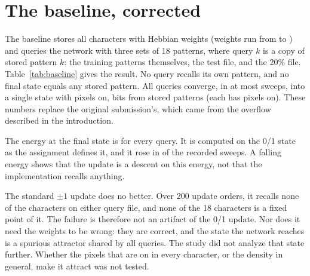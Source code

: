 \section{The baseline, corrected}
\label{sec:baseline}

The baseline stores all  characters with Hebbian weights (weights run from  to ) and queries the network with three sets of 18 patterns, where query $k$ is a copy of stored pattern $k$: the training patterns themselves, the test file, and the 20\% file. Table~\ref{tab:baseline} gives the result. No query recalls its own pattern, and no final state equals any stored pattern. All  queries converge, in at most  sweeps, into a single state with  pixels on,  bits from stored patterns  (each has  pixels on). These numbers replace the original submission's, which came from the overflow described in the introduction.

\begin{table}[t]
\caption{Baseline result,  stored patterns, Hebbian weights, the assignment's update. Sweeps include the final, unchanged one.}
\label{tab:baseline}
\centering
\footnotesize
\setlength{\tabcolsep}{3pt}

\end{table}

The energy at the final state is  for every query. It is computed on the 0/1 state as the assignment defines it, and it rose in  of the  recorded sweeps. A falling energy shows that the update is a descent on this energy, not that the implementation recalls anything.

The standard $\pm 1$ update does no better. Over 200 update orders, it recalls none of the characters on either query file, and none of the 18 characters is a fixed point of it. The failure is therefore not an artifact of the 0/1 update. Nor does it need the weights to be wrong: they are correct, and the state the network reaches is a spurious attractor shared by all queries. The study did not analyze that state further. Whether the  pixels that are on in every character, or the density in general, make it attract was not tested.
